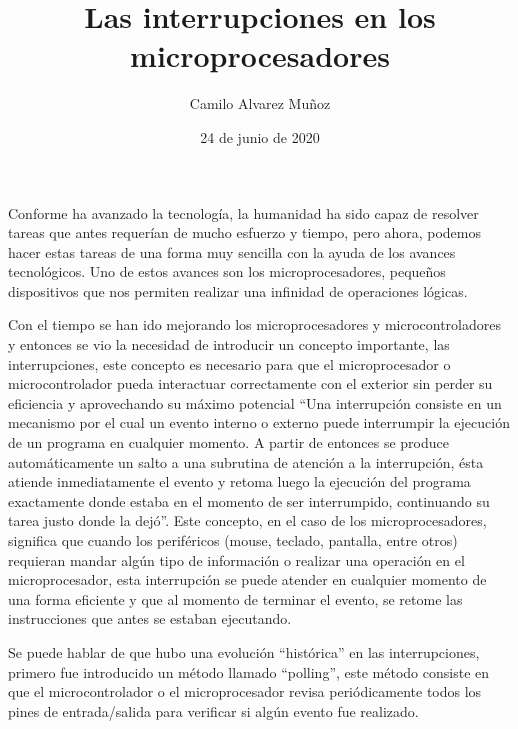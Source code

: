 \documentclass[11pt]{article}
\title{Las interrupciones en los microprocesadores}
\author{Camilo Alvarez Muñoz}
\date{24 de junio de 2020}
\begin{document}
{
\maketitle}
Conforme ha avanzado la tecnología, la humanidad ha sido capaz de resolver tareas que antes requerían de mucho esfuerzo y tiempo, pero ahora, podemos hacer estas tareas de una forma muy sencilla con la ayuda de los avances tecnológicos. Uno de estos avances son los microprocesadores, pequeños dispositivos que nos permiten realizar una infinidad de operaciones lógicas.

Con el tiempo se han ido mejorando los microprocesadores y microcontroladores y entonces se vio la necesidad de introducir un concepto importante, las interrupciones, este concepto es necesario para que el microprocesador o microcontrolador pueda interactuar correctamente con el exterior sin perder su eficiencia y aprovechando su máximo potencial “Una interrupción consiste en un mecanismo por el cual un evento interno o externo puede interrumpir la ejecución de un programa en cualquier momento. A partir de entonces se produce automáticamente un salto a una subrutina de atención a la interrupción, ésta atiende inmediatamente el evento y retoma luego la ejecución del programa exactamente donde estaba en el momento de ser interrumpido, continuando su tarea justo donde la dejó”\cite{apaza2017microcontroladores}. Este concepto, en el caso de los microprocesadores, significa que cuando los periféricos (mouse, teclado, pantalla, entre otros) requieran mandar algún tipo de información o realizar una operación en el microprocesador, esta interrupción se puede atender en cualquier momento de una forma eficiente y que al momento de terminar el evento, se retome las instrucciones que antes se estaban ejecutando.

Se puede hablar de que hubo una evolución “histórica” en las interrupciones, primero fue introducido un método llamado “polling”, este método consiste en que el microcontrolador o el microprocesador revisa periódicamente todos los pines de entrada/salida para verificar si algún evento fue realizado.

\medskip
 
\end{document}

